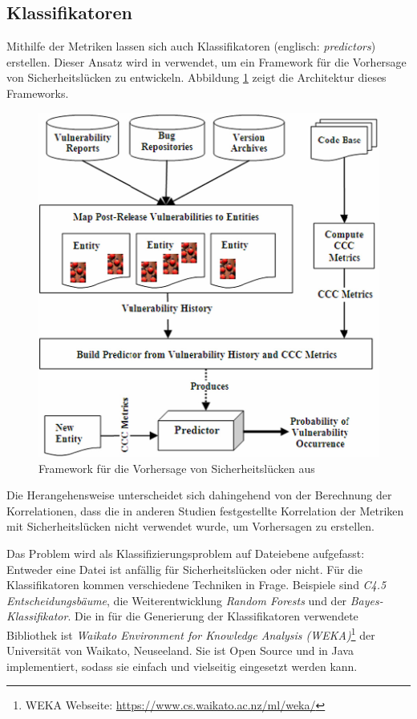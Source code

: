 \subsection{Klassifikatoren}
Mithilfe der Metriken lassen sich auch Klassifikatoren (englisch: \emph{predictors}) erstellen.
Dieser Ansatz wird in \cite{chowdhury_zulkernine_2009} verwendet, um ein Framework für die Vorhersage von Sicherheitslücken zu entwickeln.
Abbildung \ref{fig:framework} zeigt die Architektur dieses Frameworks.
\begin{figure}
	\includegraphics[width=\textwidth]{img/framework.png}
	\caption{Framework für die Vorhersage von Sicherheitslücken aus \cite{chowdhury_zulkernine_2009}}
	\label{fig:framework}
\end{figure}
Die Herangehensweise unterscheidet sich dahingehend von der Berechnung der Korrelationen, dass die in anderen Studien festgestellte Korrelation der Metriken mit Sicherheitslücken nicht verwendet wurde, um Vorhersagen zu erstellen.

Das Problem wird als Klassifizierungsproblem auf Dateiebene aufgefasst:
Entweder eine Datei ist anfällig für Sicherheitslücken oder nicht.
Für die Klassifikatoren kommen verschiedene Techniken in Frage.
Beispiele sind \emph{C4.5 Entscheidungsbäume}\cite{decision_trees}, die Weiterentwicklung \emph{Random Forests} und der \emph{Bayes-Klassifikator}.
Die in \cite{chowdhury_zulkernine_2009} für die Generierung der Klassifikatoren verwendete Bibliothek ist \emph{Waikato Environment for Knowledge Analysis (WEKA)}\footnote{WEKA Webseite: \url{https://www.cs.waikato.ac.nz/ml/weka/}} der Universität von Waikato, Neuseeland.
Sie ist Open Source und in Java implementiert, sodass sie einfach und vielseitig eingesetzt werden kann.

